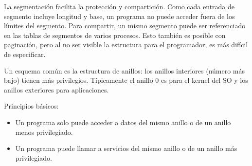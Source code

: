 La segmentación facilita la protección y compartición. Como cada entrada de segmento incluye longitud y base, un programa no puede acceder fuera de los límites del segmento. Para compartir, un mismo segmento puede ser referenciado en las tablas de segmentos de varios procesos. Esto también es posible con paginación, pero al no ser visible la estructura para el programador, es más difícil de especificar.

Un esquema común es la estructura de anillos: los anillos interiores (número más bajo) tienen más privilegios. Típicamente el anillo 0 es para el kernel del SO y los anillos exteriores para aplicaciones.

Principios básicos:
\begin{itemize}
  \item Un programa solo puede acceder a datos del mismo anillo o de un anillo menos privilegiado.
  \item Un programa puede llamar a servicios del mismo anillo o de un anillo más privilegiado.
\end{itemize}

